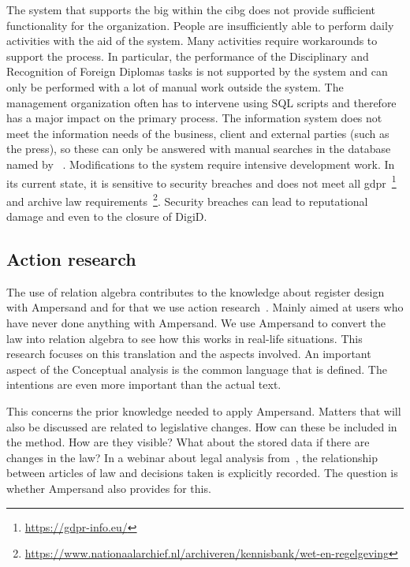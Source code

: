 The system that supports the \acrfull{big} within the \acrshort{cibg} does not provide sufficient functionality for the organization.
People are insufficiently able to perform daily activities with the aid of the system.
Many activities require workarounds to support the process. 
In particular, the performance of the Disciplinary and Recognition of Foreign Diplomas tasks is not supported by the system and can only be performed with a lot of manual work outside the system.
The management organization often has to intervene using SQL scripts and therefore has a major impact on the primary process. 
The information system does not meet the information needs of the business, client and external parties (such as the press), so these can only be answered with manual searches in the database named by ~.
Modifications to the system require intensive development work.
In its current state, it is sensitive to security breaches and does not meet all \acrfull{gdpr}~\footnote{\url{https://gdpr-info.eu/}} and archive law requirements~\footnote{\url{https://www.nationaalarchief.nl/archiveren/kennisbank/wet-en-regelgeving}}.
Security breaches can lead to reputational damage and even to the closure of DigiD.


\subsection{Action research} \label{action_research}
The use of relation algebra contributes to the knowledge about register design with Ampersand and for that we use action research~\citep{Easterbrook}.
Mainly aimed at users who have never done anything with Ampersand.
We use Ampersand to convert the law into relation algebra to see how this works in real-life situations.
This research focuses on this translation and the aspects involved.
An important aspect of the Conceptual analysis is the common language that is defined.
The intentions are even more important than the actual text.

This concerns the prior knowledge needed to apply Ampersand.
Matters that will also be discussed are related to legislative changes.
How can these be included in the method.
How are they visible?
What about the stored data if there are changes in the law?
In a webinar about legal analysis from~, the relationship between articles of law and decisions taken is explicitly recorded.
The question is whether Ampersand also provides for this.

